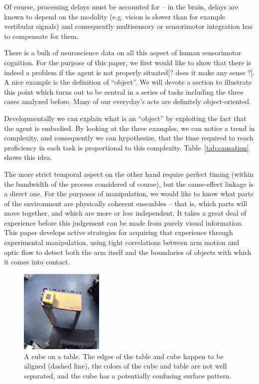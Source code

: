 \ifverbose
  Of
course, processing delays must be accounted for -- in the brain,
delays are known to depend on the modality (e.g. vision is slower than
for example vestibular signals) and consequently multisensory or
sensorimotor integration has to compensate for them.
\fi



\ifverbose
There is a bulk of neuroscience data on all this aspect of human
sensorimotor cognition. For the purpose of this paper, we first would
like to show that there is indeed a problem if the agent is not
properly situated[? does it make any sense ?]. A nice example is the
definition of ``object''.  We will devote a
section to illustrate this point which turns out to be central in a
series of tasks including the three cases analyzed before. Many of our everyday's
acts are definitely object-oriented.

Developmentally we can explain what is an ``object'' by exploiting
the fact that the agent is embodied.
By looking at the three examples, we can notice a trend in complexity, 
and consequently we can hypothesize, that the time required to reach proficiency 
in each task is proportional to this complexity. Table~\ref{tab:causation} shows this idea.
\fi



\ifverbose
The more strict
temporal aspect on the other hand require perfect timing (within the
bandwidth of the process considered of course), but the cause-effect
linkage is a direct one.
For the purposes of manipulation, we would like to know what parts of
the environment are physically coherent ensembles -- that is, which
parts will move together, and which are more or less independent.  It
takes a great deal of experience before this judgement can be made
from purely visual information.  This paper develops active strategies
for acquiring that experience through experimental manipulation, using
tight correlations between arm motion and optic flow to detect both
the arm itself and the boundaries of objects with which it comes into
contact.
\fi

\ifverbose
\begin{figure}[tb]
\begin{center}
\includegraphics[width=4cm]{setup-sequence.eps}
\caption{ 
\label{fig:setup-sequence}
A cube on a table. The edges of the table and cube happen to be
aligned (dashed line), the colors of the cube and table are not well
separated, and the cube has a potentially confusing surface pattern.
}
\end{center}
\end{figure}
\fi

